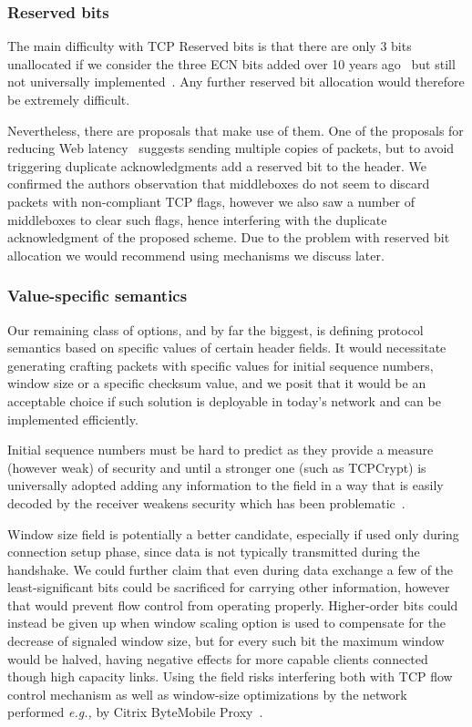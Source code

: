 \documentclass{sig-alternate-10pt}
\providecommand{\eg}{\emph{e.g.,} }
\begin{document}
\subsubsection*{Reserved bits}

The main difficulty with TCP Reserved bits is that there are only 3 bits unallocated if we consider the three ECN bits added over 10 years ago~\cite{Floyd:up,Ely:uc} but still not universally implemented~\cite{Kuhlewind:2013hr}. Any further reserved bit allocation would therefore be extremely difficult.

Nevertheless, there are proposals that make use of them. One of the proposals for reducing Web latency~\cite{Flach:2013uy} suggests sending multiple copies of packets, but to avoid triggering duplicate acknowledgments add a reserved bit to the header. We confirmed the authors observation that middleboxes do not seem to discard packets with non-compliant TCP flags, however we also saw a number of middleboxes to clear such flags, hence interfering with the duplicate acknowledgment of the proposed scheme. Due to the problem with reserved bit allocation we would recommend using mechanisms we discuss later.

\subsubsection*{Value-specific semantics}

Our remaining class of options, and by far the biggest, is defining protocol semantics based on specific values of certain header fields. It would necessitate generating crafting packets with specific values for initial sequence numbers, window size or a specific checksum value, and we posit that it would be an acceptable choice if such solution is deployable in today's network and can be implemented efficiently.

Initial sequence numbers must be hard to predict as they provide a measure (however weak) of security and until a stronger one (such as TCPCrypt) is universally adopted adding any information to the field in a way that is easily decoded by the receiver weakens security which has been problematic~\cite{Qian:2012bj,Bellovin:uz,Qian:2012wb}.

Window size field is potentially a better candidate, especially if used only during connection setup phase, since data is not typically transmitted during the handshake. We could further claim that even during data exchange a few of the least-significant bits could be sacrificed for carrying other information, however that would prevent flow control from operating properly. Higher-order bits could instead be given up when window scaling option is used to compensate for the decrease of signaled window size, but for every such bit the maximum window would be halved, having negative effects for more capable clients connected though high capacity links. Using the field risks interfering both with TCP flow control mechanism as well as window-size optimizations by the network~\cite{Kopparty:2002ht,Chakravorty:2003dm} performed \eg by Citrix ByteMobile Proxy~\cite{Ha:2006td}. 
\end{document}

